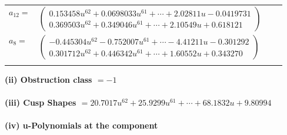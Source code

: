 \documentclass[1p]{elsarticle_modified}
\theoremstyle{definition}
\begin{document}
\begin{tabular}{m{7pt} m{180pt} m{7pt} m{180pt} }
\flushright $a_{12}=$&$\begin{pmatrix}0.153458 u^{62}+0.0698033 u^{61}+\cdots+2.02811 u-0.0419731\\0.369503 u^{62}+0.349046 u^{61}+\cdots+2.10549 u+0.618121\end{pmatrix}$ \\
\flushright $a_{8}=$&$\begin{pmatrix}-0.445304 u^{62}-0.752007 u^{61}+\cdots-4.41211 u-0.301292\\0.301712 u^{62}+0.446342 u^{61}+\cdots+1.60552 u+0.343270\end{pmatrix}$\\&\end{tabular}
\flushleft \textbf{(ii) Obstruction class $= -1$}\\~\\
\flushleft \textbf{(iii) Cusp Shapes $= 20.7017 u^{62}+25.9299 u^{61}+\cdots+68.1832 u+9.80994$}\\~\\
\newpage\renewcommand{\arraystretch}{1}
\flushleft \textbf{(iv) u-Polynomials at the component}\newline \\
\end{document}

